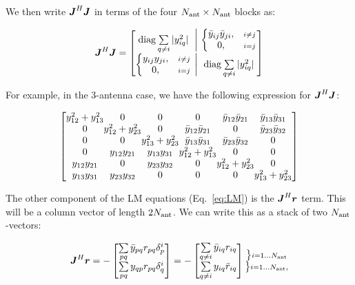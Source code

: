 \documentclass[useAMS,usenatbib]{mn2e}
\newcommand{\mat}[1]{{\bmath{#1}}}
\newcommand{\JJ}{\mat{J}} %
\begin{document}
We then write $\JJ^H\JJ$ in terms of the four $N_\mathrm{ant}\times N_\mathrm{ant}$ blocks as:

\begin{equation}
\label{eq:JHJ:DI}
\JJ^H \JJ = \Matrix{c@{~\bigg |~}c}{
\mathrm{diag} \sum\limits_{q\ne i} |y_{iq}^2| & 
  \left \{ 
  \begin{array}{@{}cc@{}}
   \bar{y}_{ij} \bar{y}_{ji}, &{\scriptstyle i\ne j} \\
   0, &{\scriptstyle i=j}
  \end{array} \right .\\
  \left \{ 
  \begin{array}{@{}cc@{}}
   y_{ij}y_{ji},&{\scriptstyle i\ne j} \\
   0, &{\scriptstyle i=j}
  \end{array} \right . 
  & \mathrm{diag} \sum\limits_{q\ne i} |y^2_{iq}| 
}
\end{equation}

For example, in the 3-antenna case, we have the following expression for
$\JJ^H \JJ$:

\newcommand{\yysq}[2]{{y^2_{#1}+y^2_{#2}}}
\newcommand{\bb}[2]{{\bar{y}_{#1#2}\bar{y}_{#2#1}}}
\newcommand{\bbb}[2]{y_{#1#2}y_{#2#1}}
\begin{equation}
\label{eq:JHJ:3ant}
{\scriptstyle
\Matrix{c@{}c@{}c@{}c@{}c@{}c}{
\yysq{12}{13} & 0             & 0             & 0             & \bb{1}{2}       & \bb{1}{3} \\
0             & \yysq{12}{23} & 0             & \bb{1}{2}       & 0             & \bb{2}{3} \\
0             & 0             & \yysq{13}{23} & \bb{1}{3}       & \bb{2}{3}       & 0       \\
0             & \bbb{1}{2}      & \bbb{1}{3}      & \yysq{12}{13} & 0             & 0       \\ 
\bbb{1}{2}      & 0             & \bbb{2}{3}      & 0             & \yysq{12}{23} & 0 \\
\bbb{1}{3}      & \bbb{2}{3}      & 0             & 0             & 0             &  \yysq{13}{23}  
}
}
\end{equation}

The other component of the LM equations (Eq.~\ref{eq:LM}) is the $\JJ^H\bmath{r}$ term. This will be a column
vector of length $2N_\mathrm{ant}$. We can write this as a stack of two $N_\mathrm{ant}$-vectors:


\begin{equation}
\label{eq:JHR:DI}
\JJ^H\bmath{r} = -\Matrix{c}{ 
\sum\limits_{pq} \bar{y}_{pq} r_{pq} \delta^{i}_p  \\
\sum\limits_{pq} y_{qp} r_{pq} \delta^{i}_q 
} = -\Matrix{c}{
\sum\limits_{q\ne i} \bar{y}_{iq} r_{iq}   \\
\sum\limits_{q\ne i} y_{iq} \bar{r}_{iq}  
}
\Stack{
\big \} \scriptstyle i=1\dots \Na \\ 
\big \} \scriptstyle i=1\dots \Na,
}
\end{equation}
\end{document}
